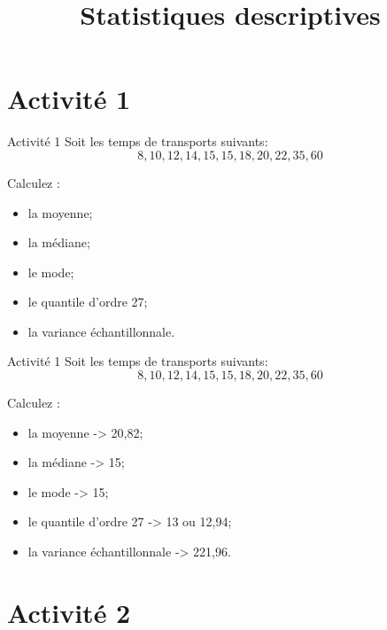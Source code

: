 \documentclass{BeamerTemplate}
\title{Statistiques descriptives}
\date{}
\begin{document}
\begin{frame}

\titlepage

\end{frame}

\section{Activité 1}
\begin{frame}[t]{Activité 1}
    Soit les temps de transports suivants:
    $$8, 10, 12, 14, 15, 15,  18, 20, 22, 35, 60 $$

    Calculez :
    \begin{itemize}
        \item la moyenne;
        \item la médiane;
        \item le mode;
        \item le quantile d'ordre 27;
        \item la variance échantillonnale.
    \end{itemize}
\end{frame}

\begin{frame}[t]{Activité 1}
    Soit les temps de transports suivants:
    $$8, 10, 12, 14, 15, 15,  18, 20, 22, 35, 60 $$

    Calculez :
    \begin{itemize}
        \item la moyenne -> 20,82;
        \item la médiane -> 15;
        \item le mode -> 15;
        \item le quantile d'ordre 27 -> 13 ou 12,94;
        \item la variance échantillonnale -> 221,96.
    \end{itemize}
\end{frame}

\section{Activité 2}
\end{document}
